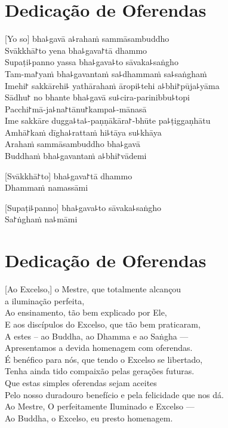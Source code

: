 \chapter*{Dedicação de Oferendas}

\delegateSetUseNext

[Yo so] bha꜕gavā a꜕rahaṁ sammāsambuddho\\
Svākkhā꜓to yena bha꜕gava꜓tā dhammo\\
Supaṭi꜕panno yassa bha꜕gava꜕to sāvaka꜕saṅgho\\
Tam-ma꜓yaṁ bha꜕gavantaṁ sa꜕dhammaṁ sa꜕saṅghaṁ\\
Imehi꜓ sakkārehi꜕ yathārahaṁ āropi꜕tehi a꜕bhi꜓pūja꜕yāma\\
Sādhu꜓ no bhante bha꜕gavā su꜕cira-parinibbu꜕topi\\
Pacchi꜓mā-ja꜕na꜓tānu꜓kampa꜕-mānasā\\
Ime sakkāre dugga꜕ta꜕-paṇṇākāra꜓-bhūte pa꜕ṭiggaṇhātu\\
Amhā꜓kaṁ dīgha꜕rattaṁ hi꜕tāya su꜕khāya\\
Arahaṁ sammāsambuddho bha꜕gavā\\
Buddhaṁ bha꜕gavantaṁ a꜕bhi꜓vādemi 

[Svākkhā꜓to] bha꜕gava꜓tā dhammo\\
Dhammaṁ namassāmi 

[Supaṭi꜕panno] bha꜕gava꜕to sāvaka꜕saṅgho\\
Sa꜓ṅghaṁ na꜕māmi 

\clearpage

\chapter{Dedicação de Oferendas}

[Ao Excelso,] o Mestre, que totalmente alcançou\\
\vin a iluminação perfeita,\\
Ao ensinamento, tão bem explicado por Ele,\\
E aos discípulos do Excelso, que tão bem praticaram,\\
A estes – ao Buddha, ao Dhamma e ao Saṅgha ---\\
Apresentamos a devida homenagem com oferendas.\\
É benéfico para nós, que tendo o Excelso se libertado,\\
Tenha ainda tido compaixão pelas gerações futuras.\\
Que estas simples oferendas sejam aceites\\
Pelo nosso duradouro benefício e pela felicidade que nos dá.\\
Ao Mestre, O perfeitamente Iluminado e Excelso ---\\
Ao Buddha, o Excelso, eu presto homenagem. 

